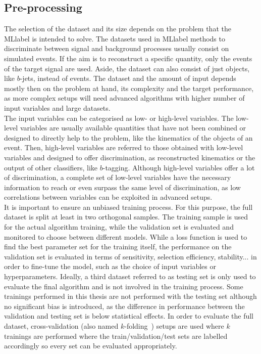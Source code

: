 \subsection{Pre-processing}

The selection of the dataset and its size depends on the problem that the \acrshort{MLlabel} is intended to solve. The datasets used in \acrshort{MLlabel} methods to discriminate between signal and background processes usually consist on simulated events. If the aim is to reconstruct a specific quantity, only the events of the target signal are used. Aside, the dataset can also consist of just objects, like $b$-jets, instead of events. The dataset and the amount of input depends mostly then on the problem at hand, its complexity and the target performance, as more complex setups will need advanced algorithms with higher number of input variables and large datasets.\\

The input variables can be categorised as low- or high-level variables. The low-level variables are usually available quantities that have not been combined or designed to directly help to the problem, like the kinematics of the objects of an event. Then, high-level variables are referred to those obtained with low-level variables and designed to offer discrimination, as reconstructed kinematics or the output of other classifiers, like $b$-tagging. Although high-level variables offer a lot of discrimination, a complete set of low-level variables have the necessary information to reach or even surpass the same level of discrimination, as low correlations between variables can be exploited in advanced setups.\\

It is important to ensure an unbiased training process. For this purpose, the full dataset is split at least in two orthogonal samples. The training sample is used for the actual algorithm training, while the validation set is evaluated and monitored to choose between different models. While a loss function is used to find the best parameter set for the training itself, the performance on the validation set is evaluated in terms of sensitivity, selection efficiency, stability... in order to fine-tune the model, such as the choice of input variables or hyperparameters. Ideally, a third dataset referred to as testing set is only used to evaluate the final algorithm and is not involved in the training process. Some trainings performed in this thesis are not performed with the testing set although no significant bias is introduced, as the difference in performance between the validation and testing set is below statistical effects. In order to evaluate the full dataset, cross-validation (also named $k$-folding~\cite{EncyclopediaofML}) setups are used where $k$ trainings are performed where the train/validation/test sets are labelled accordingly so every set can be evaluated appropriately.\\


